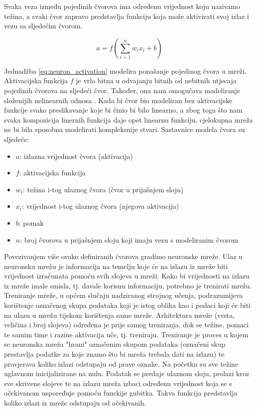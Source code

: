 Svaka veza između pojedinih čvorova ima određenu vrijednost koju nazivamo težina, a svaki čvor
zapravo predstavlja funkciju koja može aktivirati svoj izlaz i vezu sa sljedećim čvorom.

\begin{equation}
  \label{eq:neuron_activation}
  a = f\left(\sum_{i=1}^n w_i x_i + b\right)
\end{equation}

Jednadžba \eqref{eq:neuron_activation} modelira ponašanje pojedinog čvora u mreži. Aktivacijska
funkcija \( f \) je vrlo bitna u odvajanju bitnih od nebitnih utjecaja pojedinih čvorova na sljedeći
čvor. Također, ona nam omogućava modeliranje složenijih nelinearnih odnosa \cite{activation_fcn}.
Kada bi čvor bio modeliran
bez aktivacijske funkcije svako preslikavanje koje bi činio bi bilo linearno, a zbog toga što nam
svaka kompozicija linernih funkcija daje opet linearnu funkciju, cjelokupna mreža ne bi bila sposobna
modelirati kompleksnije stvari. Sastavnice modela čvora su sljedeće:

\begin{itemize}
  \item \( a \): izlazna vrijednost čvora (aktivacija)
  \item \( f \): aktivacijska funkcija
  \item \( w_i \): težina i-tog ulaznog čvora (čvor u prijašnjem sloju)
  \item \( x_i \): vrijednost i-tog ulaznog čvora (njegova aktivacija)
  \item \( b \): pomak
  \item \( n \): broj čvorova u prijašnjem sloju koji imaju vezu s modeliranim čvorom
\end{itemize}

Povezivanjem više ovako definiranih čvorova gradimo neuronske mreže. Ulaz u neuronsku mrežu 
je informacija na temelju koje će na izlazu iz mreže biti vrijednost izračunata pomoću svih
slojeva u mreži. Kako bi vrijednosti na izlazu iz mreže imale smisla, tj. davale korisnu
informaciju, potrebno je trenirati mrežu. Treniranje mreže, u općem slučaju nadziranog strojnog
učenja, podrazumijeva korištenje označenog skupa podataka koji je istog oblika kao i podaci
koji će biti na ulazu u mrežu tijekom korištenja same mreže. Arhitektura mreže (vrsta, veličina
i broj slojeva) određena je prije samog treniranja, dok se težine, pomaci te samim time i 
razine aktivacija uče, tj. treniraju. Treniranje je proces u kojem se neuronska mreža "hrani" 
označenim skupom podataka (označeni skup prestavlja podatke za koje znamo što bi mreža trebala
dati na izlazu) te provjerava koliko izlazi odstupaju od prave oznake. Na početku su sve težine
uglavnom inicijalizirane na nulu. Podatak se predaje ulaznom sloju, prolazi kroz sve skrivene
slojeve te na izlazu mreža izbaci određenu vrijednost koja se s očekivanom uspoređuje pomoću
funckije gubitka. Takva funkcija predstavlja koliko izlazi iz mreže odstupaju od očekivanih.

